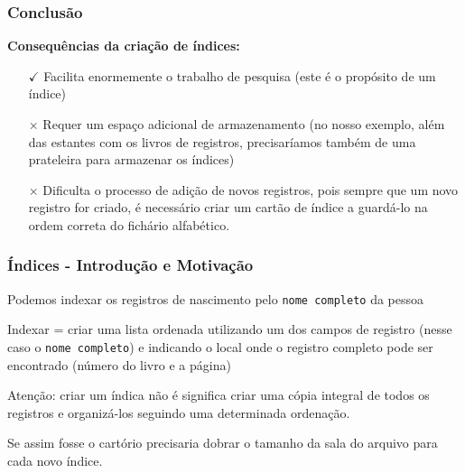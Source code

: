 \documentclass[t, 10pt, aspectratio=169, table, x11names]{beamer}
\begin{document}
	\begin{frame}
		\frametitle{Conclusão}
		\textbf{Consequências da criação de índices:}
		\bigskip
		\begin{itemize}
			\item[\textbf{$\checkmark$}] Facilita enormemente o trabalho de pesquisa (este é o propósito de um índice)
			\bigskip
			\item[\textbf{$\times$}] Requer um espaço adicional de armazenamento (no nosso exemplo, além das estantes com os livros de registros, precisaríamos também de uma prateleira para armazenar os índices)
			\bigskip
			\item[$\times$] Dificulta o processo de adição de novos registros, pois sempre que um novo registro for criado, é necessário criar um cartão de índice a guardá-lo na ordem correta do fichário alfabético.
		\end{itemize}
	\end{frame}



	\begin{frame}
		\frametitle{Índices - Introdução e Motivação}
		Podemos indexar os registros de nascimento pelo \texttt{nome completo} da pessoa
		\bigskip
		
		Indexar = criar uma lista ordenada utilizando um dos campos de registro (nesse caso o \texttt{nome completo}) e indicando o local onde o registro completo pode ser encontrado (número do livro e a página)
		\bigskip
		
		Atenção: criar um índica não é significa criar uma cópia integral de todos os registros e organizá-los seguindo uma determinada ordenação.
		\bigskip
		
		Se assim fosse o cartório precisaria dobrar o tamanho da sala do arquivo para cada novo índice. 

	\end{frame}
\end{document}
